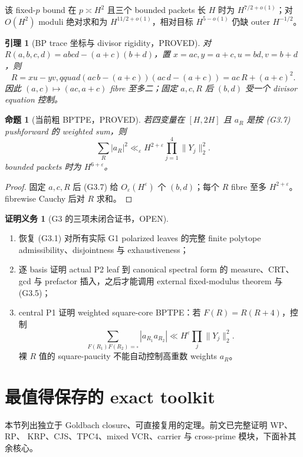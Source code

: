 \documentclass[11pt,a4paper]{ctexart}
\newtheorem{lemma}[theorem]{引理}
\newtheorem{proposition}[theorem]{命题}
\theoremstyle{definition}
\newtheorem{obligation}[theorem]{证明义务}
\newcommand{\1}{\mathbf 1}
\newcommand{\PROVED}{\textcolor{green!40!black}{\textsf{PROVED}}}
\newcommand{\OPEN}{\textcolor{red!70!black}{\textsf{OPEN}}}
\begin{document}
该 fixed-$p$ bound 在 $p\asymp H^2$ 且三个 bounded packets 长 $H$ 时为
$H^{7/2+o(1)}$；对 $O(H^2)$ moduli 绝对求和为 $H^{11/2+o(1)}$，相对目标
$H^{5-o(1)}$ 仍缺 outer $H^{-1/2}$。

\begin{lemma}[BP trace 坐标与 divisor rigidity，\PROVED]
对
$R(a,b,c,d)=abcd-(a+c)(b+d)$，置
$x=ac,y=a+c,u=bd,v=b+d$，则
\[
 R=xu-yv,qquad (ac\,b-(a+c))(ac\,d-(a+c))=ac\,R+(a+c)^2.\tag{G3.7}
\]
因此 $(a,c)\mapsto(ac,a+c)$ fibre 至多二；固定 $a,c,R$ 后 $(b,d)$ 受一个
divisor equation 控制。
\end{lemma}

\begin{proposition}[当前粗 BPTPE，\PROVED]
若四变量在 $[H,2H]$ 且 $a_R$ 是按 (G3.7) pushforward 的 weighted sum，则
\[
 \sum_R|a_R|^2\ll_\varepsilon H^{2+\varepsilon}
 \prod_{j=1}^4\|Y_j\|_2^2.                           \tag{G3.8}
\]
bounded packets 时为 $H^{6+\varepsilon}$。
\end{proposition}
\begin{proof}
固定 $a,c,R$ 后 (G3.7) 给 $O_\varepsilon(H^\varepsilon)$ 个 $(b,d)$；每个
$R$ fibre 至多 $H^{2+\varepsilon}$。fibrewise Cauchy 后对 $R$ 求和。
\end{proof}

\begin{obligation}[G3 的三项未闭合证书，\OPEN]
\begin{enumerate}
\item 恢复 (G3.1) 对所有实际 G1 polarized leaves 的完整 finite polytope
      admissibility、disjointness 与 exhaustiveness；
\item 逐 basis 证明 actual P2 leaf 到 canonical spectral form 的 measure、CRT、
      gcd 与 prefactor 插入，之后才能调用 external fixed-modulus theorem 与 (G3.5)；
\item central P1 证明 weighted square-core BPTPE：若 $F(R)=R(R+4)$，控制
\[
 \sum_{F(R_1)F(R_2)=\square}|a_{R_1}a_{R_2}|
 \ll H^\varepsilon\prod_j\|Y_j\|_2^2.              \tag{G3.9}
\]
裸 $R$ 值的 square-paucity 不能自动控制高重数 weights $a_R$。
\end{enumerate}
\end{obligation}

\section{最值得保存的 exact toolkit}
\label{sec:toolkit}

本节列出独立于 Goldbach closure、可直接复用的定理。前文已完整证明 WP、RP、
KRP、CJS、TPC4、mixed VCR、carrier 与 cross-prime 模块，下面补其余核心。
\end{document}
